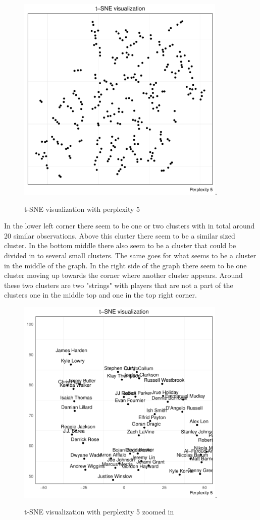 \documentclass{article}
\begin{document}
\begin{figure}[h]
 \centering
 \includegraphics[height=10cm]{tsneper5}.
 \caption{t-SNE visualization with perplexity 5}
 \label{figure:1}
\end{figure}

In the lower left corner there seem to be one or two clusters with in total around 20 similar observations.  Above this cluster there seem to be a similar sized cluster. In the bottom middle there also seem to be a cluster that could be divided in to several small clusters. The same goes for what seems to be a cluster in the middle of the graph. In the right side of the graph there seem to be one cluster moving up towards the corner where another cluster appears. Around these two clusters are two "strings" with players that are not a part of the clusters one in the middle top and one in the top right corner.

 
\begin{figure}[h]
 \centering
 \includegraphics[height=10cm]{zoom1}.
 \caption{t-SNE visualization with perplexity 5 zoomed in}
 \label{figure:1}
\end{figure}
\end{document}
